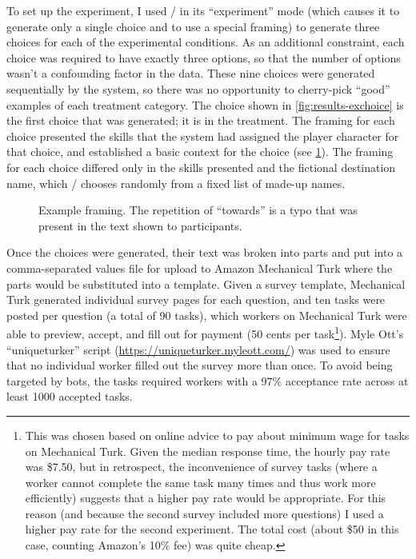 To set up the experiment, I used \dunyazad/ in its ``experiment'' mode (which causes it to generate only a single choice and to use a special framing) to generate three choices for each of the experimental conditions.
%
As an additional constraint, each choice was required to have exactly three options, so that the number of options wasn't a confounding factor in the data.
%
These nine choices were generated sequentially by the system, so there was no opportunity to cherry-pick ``good'' examples of each treatment category.
%
The choice shown in \cref{fig:results-exchoice} is the first choice that was generated; it is in the \dlm{} treatment.
%
The framing for each choice presented the skills that the system had assigned the player character for that choice, and established a basic context for the choice (see \cref{fig:exframing}).
%
The framing for each choice differed only in the skills presented and the fictional destination name, which \dunyazad/ chooses randomly from a fixed list of made-up names.


\begin{figure}[!h]
  \caption{Example framing. The repetition of ``towards'' is a typo that was present in the text shown to participants.}
  \label{fig:exframing}
\end{figure}


Once the choices were generated, their text was broken into parts and put into a comma-separated values file for upload to Amazon Mechanical Turk where the parts would be substituted into a template.
%
Given a survey template, Mechanical Turk generated individual survey pages for each question, and ten tasks were posted per question (a total of 90 tasks), which workers on Mechanical Turk were able to preview, accept, and fill out for payment (50 cents per task\footnote{
%
This was chosen based on online advice to pay about minimum wage for tasks on Mechanical Turk.
%
Given the median response time, the hourly pay rate was \$7.50, but in retrospect, the inconvenience of survey tasks (where a worker cannot complete the same task many times and thus work more efficiently) suggests that a higher pay rate would be appropriate.
%
For this reason (and because the second survey included more questions) I used a higher pay rate for the second experiment.
%
The total cost (about \$50 in this case, counting Amazon's 10\% fee) was quite cheap.}).
%
Myle Ott's ``uniqueturker'' script (\url{https://uniqueturker.myleott.com/}) was used to ensure that no individual worker filled out the survey more than once.
%
To avoid being targeted by bots, the tasks required workers with a 97\% acceptance rate across at least 1000 accepted tasks.

